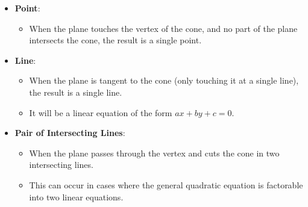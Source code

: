 \documentclass[12pt]{article}
\begin{document}
\begin{itemize}
    \item \textbf{Point}:
    \begin{itemize}
        \item When the plane touches the vertex of the cone, and no part of the plane intersects the cone, the result is a single point.
        \end{itemize}
    
    \item \textbf{Line}:
    \begin{itemize}
        \item When the plane is tangent to the cone (only touching it at a single line), the result is a single line.
        \item It will be a linear equation of the form \( ax + by + c = 0 \).
    \end{itemize}
    
    \item \textbf{Pair of Intersecting Lines}:
    \begin{itemize}
        \item When the plane passes through the vertex and cuts the cone in two intersecting lines.
        \item This can occur in cases where the general quadratic equation is factorable into two linear equations.
    \end{itemize}
\end{itemize}
\end{document}
